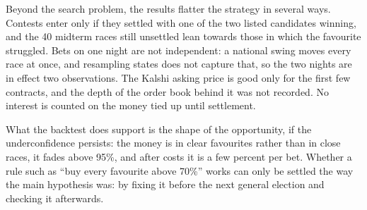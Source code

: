 Beyond the search problem, the results flatter the strategy in several ways. Contests enter only if they settled with
one of the two listed candidates winning, and the 40 midterm races still unsettled lean towards those in which the
favourite struggled. Bets on one night are not independent: a national swing moves every race at once, and resampling
states does not capture that, so the two nights are in effect two observations. The Kalshi asking price is good only
for the first few contracts, and the depth of the order book behind it was not recorded. No interest is counted on the
money tied up until settlement.

What the backtest does support is the shape of the opportunity, if the underconfidence persists: the money is in clear
favourites rather than in close races, it fades above 95\%, and after costs it is a few percent per bet. Whether a rule
such as ``buy every favourite above 70\%'' works can only be settled the way the main hypothesis was: by fixing it
before the next general election and checking it afterwards.
